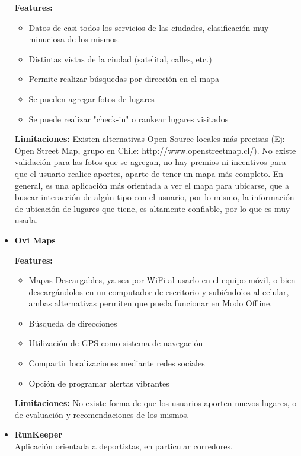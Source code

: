\documentclass[10pt,letterpaper]{article}
\begin{document}
\begin{itemize}
\textbf{Features:}
\begin{itemize}
\item Datos de casi todos los servicios de las ciudades, clasificación muy minuciosa de los mismos.
\item Distintas vistas de la ciudad (satelital, calles, etc.)
\item Permite realizar búsquedas por dirección en el mapa
\item Se pueden agregar fotos de lugares
\item Se puede realizar "check-in" o rankear lugares visitados
\end{itemize}

\textbf{Limitaciones:} Existen alternativas Open Source locales más precisas (Ej: Open Street Map, grupo en Chile: http://www.openstreetmap.cl/). No existe validación para las fotos que se agregan, no hay premios ni incentivos para que el usuario realice aportes, aparte de tener un mapa más completo. En general, es una aplicación más orientada a ver el mapa para ubicarse, que a buscar interacción de algún tipo con el usuario, por lo mismo, la información de ubicación de lugares que tiene, es altamente confiable, por lo que es muy usada.\\

\item \textbf{Ovi Maps}

\textbf{Features:}
\begin{itemize}
\item Mapas Descargables, ya sea por WiFi al usarlo en el equipo móvil, o bien descargándolos en un computador de escritorio y subiéndolos al celular, ambas alternativas permiten que pueda funcionar en Modo Offline.
\item Búsqueda de direcciones
\item Utilización de GPS como sistema de navegación
\item Compartir localizaciones mediante redes sociales
\item Opción de programar alertas vibrantes
\end{itemize}

\textbf{Limitaciones:} No existe forma de que los usuarios aporten nuevos lugares, o de evaluación y recomendaciones de los mismos.\\

\item \textbf{RunKeeper}\\

Aplicación orientada a deportistas, en particular corredores.


\end{itemize}
\end{document}

